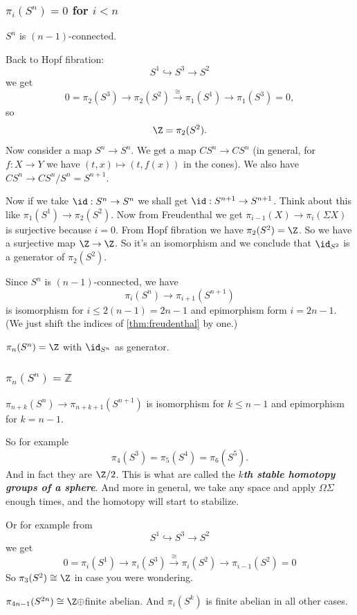 \begin{remark}
\subsubsection{\texorpdfstring{$\pi_{i}(S^{n})=0$}{πᵢ(Sⁿ)} for \texorpdfstring{$i<n$}{i<n}}

\begin{coro}
	$S^n$ is $(n-1)$-connected.
\end{coro}
Back to Hopf fibration:
\[S^1\hookrightarrow S^3\to S^2\]
we get
\[0=\pi_2(S^3)\to\pi_2(S^2)\overset{\cong}{\to}\pi_1(S^1)\to\pi_1(S^3)=0,\]
so
\[\Z=\pi_2(S^2).\]
Now consider a map $S^n\to S^n$. We get a map $CS^n\to CS^n$ (in general, for $f:X\to Y$ we have $(t,x)\mapsto(t,f(x))$ in the cones). We also have $CS^n\to CS^n/S^n=S^{n+1}$.

Now if we take $\id:S^n\to S^n$ we shall get $\id:S^{n+1}\to S^{n+1}$. Think about this like $\pi_1(S^1)\to\pi_2(S^2)$. Now from Freudenthal we get $\pi_{i-1}(X)\to\pi_i(\Sigma X)$ is surjective because $i=0$. From Hopf fibration we have $\pi_2(S^2)=\Z$. So we have a surjective map $\Z\to\Z$. So it's an isomorphism and we conclude that $\id_{S^2}$ is a generator of $\pi_2(S^2)$.
\begin{coro}
	Since $S^n$ is $(n-1)$-connected, we have
	\[\pi_i(S^n)\to\pi_{i+1}(S^{n+1})\]
	is isomorphism for $i\leq 2(n-1)=2n-1$ and epimorphism form $i=2n-1$. (We just shift the indices of \cref{thm:freudenthal} by one.)
\end{coro}
\begin{coro}
	$\pi_n(S^n)=\Z$ with $\id_{S^n}$ as generator.
\end{coro}

\subsubsection{$\pi_{n}(S^{n})=\mathbb{Z}$}
\begin{coro}
	$\pi_{n+k}(S^n)\to\pi_{n+k+1}(S^{n+1})$ is isomorphism for $k\leq n-1$ and epimorphism for $k=n-1$.
\end{coro}
So for example
\[\pi_4(S^3)=\pi_5(S^4)=\pi_6(S^5).\]
And in fact they are $\Z/2$. This is what are called the \textbf{\textit{$k$th stable homotopy groups of a sphere}}. And more in general, we take any space and apply $\Omega\Sigma$ enough times, and the homotopy will start to stabilize.

Or for example from
\[S^1\hookrightarrow S^3\to S^2\]
we get
\[0=\pi_i(S^1)\to \pi_i(S^3)\overset{\cong}{\to}\pi_i(S^2)\to\pi_{i-1}(S^2)=0\]
So $\pi_3(S^2)\cong\Z$ in case you were wondering.
\begin{claim}[Serre]
	$\pi_{4n-1}(S^{2n})\cong\Z\oplus$finite abelian. And $\pi_i(S^k)$ is finite abelian in all other cases.
\end{claim}


\end{remark}
